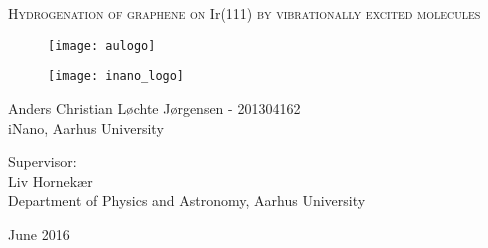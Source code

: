 
\begin{titlingpage}

\begin{center}

\vspace*{0cm}
\huge
\textsc{Hydrogenation of graphene on I}r\textsc{(111) by vibrationally excited molecules}\\
\vspace{1.5cm}

\vspace{3cm}
\begin{figure}[H]
  \centering
\texttt{[image: aulogo]}
\end{figure}
\vspace{1cm}
\begin{figure}[H]
  \centering
\texttt{[image: inano\_logo]}
\end{figure}
\vspace{2cm}

\large
{
    Anders Christian Løchte Jørgensen - 201304162\\
    iNano, Aarhus University
}

\vspace{1.5cm}

{
  Supervisor:\\
  Liv Hornekær\\
  Department of Physics and Astronomy, Aarhus University
}

{June 2016}\\


\end{center}



\end{titlingpage}
